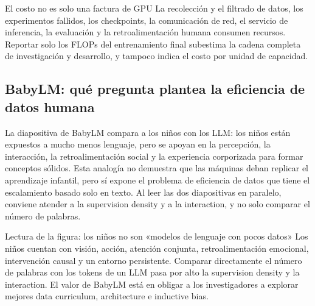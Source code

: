 \begin{warningbox}{El costo no es solo una factura de GPU}
La recolección y el filtrado de datos, los experimentos fallidos, los checkpoints, la comunicación de red, el servicio de inferencia, la evaluación y la retroalimentación humana consumen recursos. Reportar solo los FLOPs del entrenamiento final subestima la cadena completa de investigación y desarrollo, y tampoco indica el costo por unidad de capacidad.
\end{warningbox}

\subsection{BabyLM: qué pregunta plantea la eficiencia de datos humana}

La diapositiva de BabyLM compara a los niños con los LLM: los niños están expuestos a mucho menos lenguaje, pero se apoyan en la percepción, la interacción, la retroalimentación social y la experiencia corporizada para formar conceptos sólidos. Esta analogía no demuestra que las máquinas deban replicar el aprendizaje infantil, pero sí expone el problema de eficiencia de datos que tiene el escalamiento basado solo en texto. Al leer las dos diapositivas en paralelo, conviene atender a la supervision density y a la interaction, y no solo comparar el número de palabras.



\begin{knowledgebox}{Lectura de la figura: los niños no son «modelos de lenguaje con pocos datos»}
Los niños cuentan con visión, acción, atención conjunta, retroalimentación emocional, intervención causal y un entorno persistente. Comparar directamente el número de palabras con los tokens de un LLM pasa por alto la supervision density y la interaction. El valor de BabyLM está en obligar a los investigadores a explorar mejores data curriculum, architecture e inductive bias.
\end{knowledgebox}


